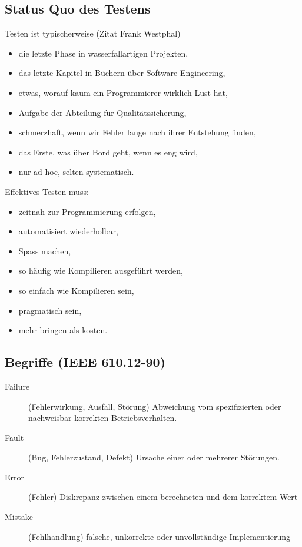 \subsection{Status Quo des Testens}
Testen ist typischerweise (Zitat Frank Westphal)
\begin{itemize}
\item  die letzte Phase in wasserfallartigen Projekten,
\item das letzte Kapitel in Büchern über Software-Engineering,
\item etwas, worauf kaum ein Programmierer wirklich Lust hat,
\item Aufgabe der Abteilung für Qualitätssicherung,
\item schmerzhaft, wenn wir Fehler lange nach ihrer Entstehung finden,
\item das Erste, was über Bord geht, wenn es eng wird,
\item nur ad hoc, selten systematisch.
\end{itemize}
\newslide
Effektives Testen muss:
\begin{itemize}
\item zeitnah zur Programmierung erfolgen,
\item automatisiert wiederholbar,
\item Spass machen,
\item so häufig wie Kompilieren ausgeführt werden,
\item so einfach wie Kompilieren sein,
\item pragmatisch sein,
\item mehr bringen als kosten.
\end{itemize}
\newslide
\subsection{Begriffe (IEEE 610.12-90)}
\begin{description}
\item[Failure] (Fehlerwirkung, Ausfall, Störung)
   Abweichung vom spezifizierten oder nachweisbar korrekten Betriebsverhalten.
 \item[Fault] (Bug, Fehlerzustand, Defekt)
   Ursache einer oder mehrerer Störungen.
 \item[Error] (Fehler)
   Diskrepanz zwischen einem berechneten und dem korrektem Wert
 \item[Mistake] (Fehlhandlung)
   falsche, unkorrekte oder unvollständige Implementierung
\end{description}
\ifslides
\newpage
\fi
%
